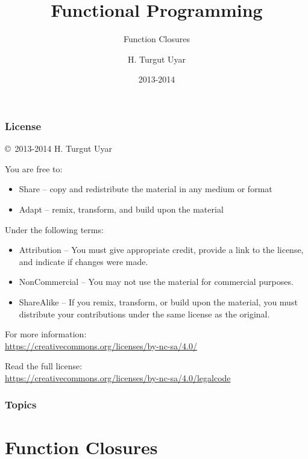 \documentclass[dvipsnames]{beamer}
\title{Functional Programming}
\subtitle{Function Closures}
\author{H. Turgut Uyar}
\date{2013-2014}
\theoremstyle{plain}
\begin{document}
\begin{frame}
  \titlepage
\end{frame}

\begin{frame}
  \frametitle{License}

  \hfill
  \copyright~2013-2014 H. Turgut Uyar

  \vfill
  \begin{footnotesize}
    You are free to:
    \begin{itemize}
      \itemsep0em
      \item Share -- copy and redistribute the material in any medium or format
      \item Adapt -- remix, transform, and build upon the material
    \end{itemize}

    Under the following terms:
    \begin{itemize}
      \itemsep0em
      \item Attribution -- You must give appropriate credit, provide a link to
        the license, and indicate if changes were made.

      \item NonCommercial -- You may not use the material for commercial
        purposes.

      \item ShareAlike -- If you remix, transform, or build upon the material,
        you must distribute your contributions under the same license as the
        original.
    \end{itemize}
  \end{footnotesize}

  \begin{small}
    For more information:\\
    \url{https://creativecommons.org/licenses/by-nc-sa/4.0/}

    \smallskip
    Read the full license:\\
    \url{https://creativecommons.org/licenses/by-nc-sa/4.0/legalcode}
  \end{small}
\end{frame}

\begin{frame}
  \frametitle{Topics}
  \tableofcontents
\end{frame}

\section{Function Closures}
\end{document}
